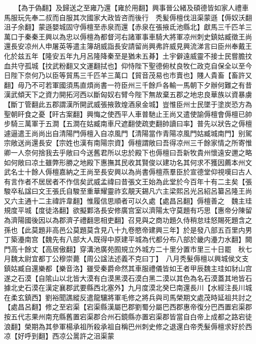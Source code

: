 　　【為于偽翻】及歸送之至雍乃還【雍於用翻】興事晉公緒及碩德皆如家人禮車馬服玩先奉二叔而自服其次國家大政皆咨而後行　秃髪傉檀伐沮渠蒙遜【傉奴沃翻沮子余翻】蒙遜嬰城固守傉檀至赤泉而還【赤泉在張掖氐池縣北】獻馬三千匹羊三萬口于秦秦王興以為忠以傉檀為都督河右諸軍事車騎大將軍凉州刺史鎮姑臧徵王尚還長安凉州人申屠英等遣主簿胡威詣長安請留尚興弗許威見興流涕言曰臣州奉戴王化於兹五年【隆安五年九月呂隆降秦至是猶未五朞】土宇僻遠威靈不接士民嘗膽抆血共守孤城【抆武粉翻又文運翻拭也】仰恃陛下聖德俯杖良牧仁政克自保全以至今日陛下奈何乃以臣等貿馬三千匹羊三萬口【貿音茂易也市賣也】賤人貴畜【畜許又翻】毋乃不可若軍國須馬直煩尚書一符臣州三千餘戶各輸一馬朝下夕辦何難之有昔漢武傾天下之資力開拓河西以斷匈奴右臂今陛下無故棄五郡之地忠良華族以資暴虜【斷丁管翻此五郡謂漢所開武威張掖敦煌酒泉金城】豈惟臣州士民墜于塗炭恐方為聖朝旰食之憂【旰古案翻】興悔之使西平人車普馳止王尚又遣使諭傉檀會傉檀已帥步騎三萬軍于五澗【五澗在姑臧南車尺遮翻使疏吏翻帥讀曰率】普先以狀告之傉檀遽逼遣王尚尚出自清陽門傉檀入自凉風門【清陽當作青陽凉風門姑臧城南門】别駕宗敞送尚還長安【宗姓也漢有南陽宗資】傉檀謂敞曰吾得凉州三千餘家情之所寄惟卿一人奈何捨我去乎敞曰今送舊君所以忠於殿下也傉檀曰吾新牧貴州懷遠安邇之略如何敞曰凉土雖弊形勝之地殿下惠撫其民收其賢俊以建功名其何求不獲因薦本州文武名士十餘人傉檀嘉納之王尚至長安興以為尚書傉檀燕羣臣於宣德堂仰視嘆曰古人有言作者不居居者不作信矣武威孟禕曰昔張文王始為此堂於今百年十有二主矣【張駿卒私諡曰文王張氏自駿至重華耀靈祚玄靚天錫凡六主梁熙呂光呂紹呂纂呂隆王尚又六主通十二主禕許韋翻】惟履信思順者可以久處【處昌呂翻】傉檀善之　魏主珪規度平城【度徒洛翻】欲擬鄴洛長安修廣宫室以濟陽太守莫題有巧思【惠帝分陳留為濟陽國後因以為郡濟子禮翻思相吏翻】召見與之商功題久侍稍怠珪怒賜死題含之孫也【此莫題非高邑公莫題莫含見八十九卷愍帝建興三年】於是發八部五百里内男丁築灅南宫【魏先有八部大人既得中原建平城為代都分布八部於畿内灅力水翻】闕門高十餘丈【高居傲翻】穿溝池廣苑囿規立外城方二十里分置市里三十日罷　秋七月魏太尉宜都丁公穆崇薨【周公諡法述義不克曰丁】　八月秃髮傉檀以興城侯文支鎮姑臧自還樂都【樂音洛】雖受秦爵命然其車服禮儀皆如王者甲辰魏主珪如豺山宫遂之石漠【自隂山以北皆大漠有白漠黑漠石漠白黑二漠以其色為名石漠蓋其地皆石據北史石漠在漢定襄郡武要縣西北塞外】九月度漠北癸巳南還長川【水經注長川城在柔玄鎮西】劉裕聞譙縱反遣龍驤將軍毛修之將兵與司馬榮期文處茂時延祖共討之【處昌呂翻】修之至宕渠【宕渠縣漢屬巴郡劉蜀分屬巴西郡惠帝復分巴西置宕渠郡按五代志果州南充縣舊置宕渠郡合州石鏡縣亦置宕渠郡皆當自白帝上成都之路宕徒浪翻】榮期為其參軍楊承祖所殺承祖自稱巴州刺史修之退還白帝秃髮傉檀求好於西凉【好呼到翻】西凉公暠許之沮渠蒙

